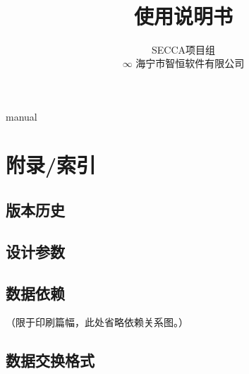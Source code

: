 \documentclass[CJK, hyperref, oneside]{z-book}
\title {\modtitle \\ \modsubtitle \\ 使用说明书}
\author{SECCA项目组 \\ $\infty$ \small{海宁市智恒软件有限公司}}
\begin{document}
\renewcommand*\sectionmark[1]{\markright{\thesection. #1}}
\renewcommand*\thesection{\arabic{section}}

\maketitle

\renewcommand\contentsname{目录/Contents}
\tableofcontents
\clearpage

\def\DIRNAME{.}
{manual}

\clearpage
\section{附录/索引}

    \subsection{版本历史}
    {
        \centering
        
    }

                                        \begin{landscape}
    \subsection{设计参数}

    \subsection{数据依赖}
        （限于印刷篇幅，此处省略依赖关系图。）

    \clearpage
    \subsection{数据交换格式}
        

                                        \end{landscape}

    \listoftables
    \listoffigures
\end{document}
